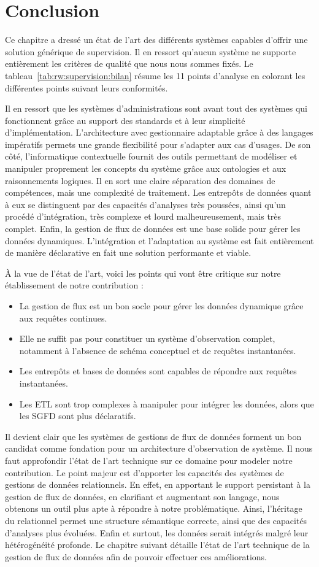 \section{Conclusion}
Ce chapitre a dressé un état de l'art des différents systèmes capables d'offrir une solution générique de supervision. Il en ressort qu'aucun système ne supporte entièrement les critères de qualité que nous nous sommes fixés. Le tableau~\ref{tab:rw:supervision:bilan} résume les 11 points d'analyse en colorant les différentes points suivant leurs conformités. 

Il en ressort que les systèmes d'administrations sont avant tout des systèmes qui fonctionnent grâce au support des standards et à leur simplicité d'implémentation. L'architecture avec gestionnaire adaptable grâce à des langages impératifs permets une grande flexibilité pour s'adapter aux cas d'usages. De son côté, l'informatique contextuelle fournit des outils permettant de modéliser et manipuler proprement les concepts du système grâce aux ontologies et aux raisonnements logiques. Il en sort une claire séparation des domaines de compétences, mais une complexité de traitement. Les entrepôts de données quant à eux se distinguent par des capacités d'analyses très poussées, ainsi qu'un procédé d'intégration, très complexe et lourd malheureusement, mais très complet. Enfin, la gestion de flux de données est une base solide pour gérer les données dynamiques. L'intégration et l'adaptation au système est fait entièrement de manière déclarative en fait une solution performante et viable.

À la vue de l'état de l'art, voici les points qui vont être critique sur notre établissement de notre contribution :
\begin{itemize}
    \item La gestion de flux est un bon socle pour gérer les données dynamique grâce aux requêtes continues.
    \item Elle ne suffit pas pour constituer un système d'observation complet, notamment à l'absence de schéma conceptuel et de requêtes instantanées.
    \item Les entrepôts et bases de données sont capables de répondre aux requêtes instantanées.
    \item Les ETL sont trop complexes à manipuler pour intégrer les données, alors que les SGFD sont plus déclaratifs.
\end{itemize}
Il devient clair que les systèmes de gestions de flux de données forment un bon candidat comme fondation pour un architecture d'observation de système. Il nous faut approfondir l'état de l'art technique sur ce domaine pour modeler notre contribution. Le point majeur est d'apporter les capacités des systèmes de gestions de données relationnels. En effet, en apportant le support persistant à la gestion de flux de données, en clarifiant et augmentant son langage, nous obtenons un outil plus apte à répondre à notre problématique. Ainsi, l'héritage du relationnel permet une structure sémantique correcte, ainsi que des capacités d'analyses plus évoluées. Enfin et surtout, les données serait intégrés malgré leur hétérogénéité profonde. Le chapitre suivant détaille l'état de l'art technique de la gestion de flux de données afin de pouvoir effectuer ces améliorations.

